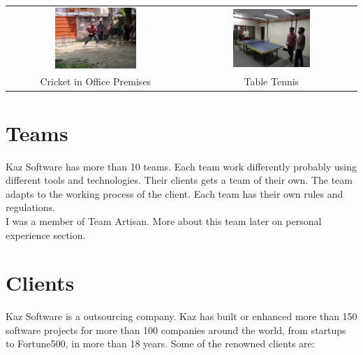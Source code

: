 \setlength{\tabcolsep}{4pt}
\begin{center}
    \begin{tabular}{cc}
    \includegraphics[width=0.475\textwidth]{images/Chapter2/cricket.jpg} & \includegraphics[width=0.475\textwidth]{images/Chapter2/tt.jpg} \\
    Cricket in Office Premises & Table Tennis \\
    \end{tabular}
\end{center}

\section{Teams}

Kaz Software has more than 10 teams.
Each team work differently probably using different tools and technologies.
Their clients gets a team of their own.
The team adapts to the working process of the client.
Each team has their own rules and regulations.\\

I was a member of Team Artisan.
More about this team later on personal experience section.

\section{Clients}

Kaz Software is a outsourcing company.
Kaz has built or enhanced more than 150 software projects for more than 100 companies around the world, from startups to Fortune500, in more than 18 years.
Some of the renowned clients are:

